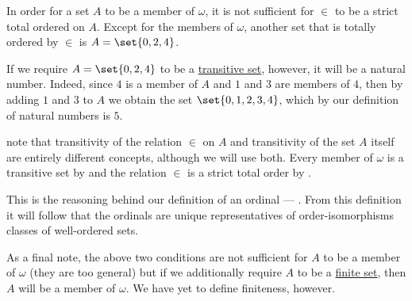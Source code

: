 \begin{remark}
  In order for a set \( A \) to be a member of \( \omega \), it is not sufficient for \( \in \) to be a strict total ordered on \( A \). Except for the members of \( \omega \), another set that is totally ordered by \( \in \) is \( A = \set{ 0, 2, 4 } \).

  If we require \( A = \set{ 0, 2, 4 } \) to be a \hyperref[def:transitive_set]{transitive set}, however, it will be a natural number. Indeed, since \( 4 \) is a member of \( A \) and \( 1 \) and \( 3 \) are members of \( 4 \), then by adding \( 1 \) and \( 3 \) to \( A \) we obtain the set \( \set{ 0, 1, 2, 3, 4 } \), which by our definition of natural numbers is \( 5 \).

  note that transitivity of the relation \( \in \) on \( A \) and transitivity of the set \( A \) itself are entirely different concepts, although we will use both. Every member of \( \omega \) is a transitive set by  and the relation \( \in \) is a strict total order by .

  This is the reasoning behind our definition of an ordinal --- . From this definition it will follow that the ordinals are unique representatives of order-isomorphisms classes of well-ordered sets.

  As a final note, the above two conditions are not sufficient for \( A \) to be a member of \( \omega \) (they are too general) but if we additionally require \( A \) to be a \hyperref[def:finite_set]{finite set}, then \( A \) will be a member of \( \omega \). We have yet to define finiteness, however.
\end{remark}

